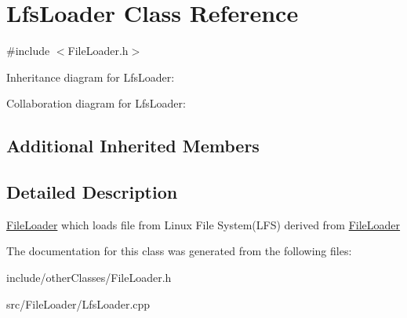\hypertarget{classLfsLoader}{}\section{Lfs\+Loader Class Reference}
\label{classLfsLoader}


{\ttfamily \#include $<$File\+Loader.\+h$>$}



Inheritance diagram for Lfs\+Loader\+:


Collaboration diagram for Lfs\+Loader\+:
\subsection*{Additional Inherited Members}


\subsection{Detailed Description}
\hyperlink{classFileLoader}{File\+Loader} which loads file from Linux File System(\+L\+F\+S) derived from \hyperlink{classFileLoader}{File\+Loader} 

The documentation for this class was generated from the following files\+:\begin{DoxyCompactItemize}
\item 
include/other\+Classes/File\+Loader.\+h\item 
src/\+File\+Loader/Lfs\+Loader.\+cpp\end{DoxyCompactItemize}
